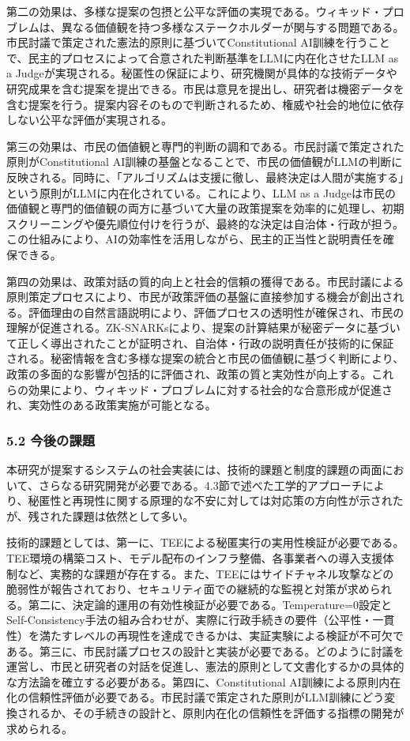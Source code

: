第二の効果は、多様な提案の包摂と公平な評価の実現である。ウィキッド・プロブレムは、異なる価値観を持つ多様なステークホルダーが関与する問題である。市民討議で策定された憲法的原則に基づいてConstitutional AI訓練を行うことで、民主的プロセスによって合意された判断基準をLLMに内在化させたLLM as a Judgeが実現される。秘匿性の保証により、研究機関が具体的な技術データや研究成果を含む提案を提出できる。市民は意見を提出し、研究者は機密データを含む提案を行う。提案内容そのもので判断されるため、権威や社会的地位に依存しない公平な評価が実現される。

第三の効果は、市民の価値観と専門的判断の調和である。市民討議で策定された原則がConstitutional AI訓練の基盤となることで、市民の価値観がLLMの判断に反映される。同時に、「アルゴリズムは支援に徹し、最終決定は人間が実施する」という原則がLLMに内在化されている。これにより、LLM as a Judgeは市民の価値観と専門的価値観の両方に基づいて大量の政策提案を効率的に処理し、初期スクリーニングや優先順位付けを行うが、最終的な決定は自治体・行政が担う。この仕組みにより、AIの効率性を活用しながら、民主的正当性と説明責任を確保できる。

第四の効果は、政策対話の質的向上と社会的信頼の獲得である。市民討議による原則策定プロセスにより、市民が政策評価の基盤に直接参加する機会が創出される。評価理由の自然言語説明により、評価プロセスの透明性が確保され、市民の理解が促進される。ZK-SNARKsにより、提案の計算結果が秘密データに基づいて正しく導出されたことが証明され、自治体・行政の説明責任が技術的に保証される。秘密情報を含む多様な提案の統合と市民の価値観に基づく判断により、政策の多面的な影響が包括的に評価され、政策の質と実効性が向上する。これらの効果により、ウィキッド・プロブレムに対する社会的な合意形成が促進され、実効性のある政策実施が可能となる。

\subsubsection{5.2 今後の課題}\label{ux4ecaux5f8cux306eux8ab2ux984c}

本研究が提案するシステムの社会実装には、技術的課題と制度的課題の両面において、さらなる研究開発が必要である。4.3節で述べた工学的アプローチにより、秘匿性と再現性に関する原理的な不安に対しては対応策の方向性が示されたが、残された課題は依然として多い。

技術的課題としては、第一に、TEEによる秘匿実行の実用性検証が必要である。TEE環境の構築コスト、モデル配布のインフラ整備、各事業者への導入支援体制など、実務的な課題が存在する。また、TEEにはサイドチャネル攻撃などの脆弱性が報告されており、セキュリティ面での継続的な監視と対策が求められる。第二に、決定論的運用の有効性検証が必要である。Temperature=0設定とSelf-Consistency手法の組み合わせが、実際に行政手続きの要件（公平性・一貫性）を満たすレベルの再現性を達成できるかは、実証実験による検証が不可欠である。第三に、市民討議プロセスの設計と実装が必要である。どのように討議を運営し、市民と研究者の対話を促進し、憲法的原則として文書化するかの具体的な方法論を確立する必要がある。第四に、Constitutional AI訓練による原則内在化の信頼性評価が必要である。市民討議で策定された原則がLLM訓練にどう変換されるか、その手続きの設計と、原則内在化の信頼性を評価する指標の開発が求められる。

